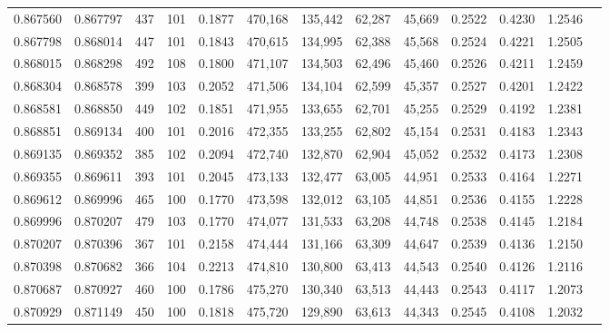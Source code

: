 \begin{tabular}{rrrrrrrrrrrrr}
0.867560 & 0.867797 &   437 & 101 &                                     0.1877 & 470,168 & 135,442 &  62,287 &  45,669 & 0.2522 & 0.4230 & 1.2546 \\
0.867798 & 0.868014 &   447 & 101 &                                     0.1843 & 470,615 & 134,995 &  62,388 &  45,568 & 0.2524 & 0.4221 & 1.2505 \\
0.868015 & 0.868298 &   492 & 108 &                                     0.1800 & 471,107 & 134,503 &  62,496 &  45,460 & 0.2526 & 0.4211 & 1.2459 \\
0.868304 & 0.868578 &   399 & 103 &                                     0.2052 & 471,506 & 134,104 &  62,599 &  45,357 & 0.2527 & 0.4201 & 1.2422 \\
0.868581 & 0.868850 &   449 & 102 &                                     0.1851 & 471,955 & 133,655 &  62,701 &  45,255 & 0.2529 & 0.4192 & 1.2381 \\
0.868851 & 0.869134 &   400 & 101 &                                     0.2016 & 472,355 & 133,255 &  62,802 &  45,154 & 0.2531 & 0.4183 & 1.2343 \\
0.869135 & 0.869352 &   385 & 102 &                                     0.2094 & 472,740 & 132,870 &  62,904 &  45,052 & 0.2532 & 0.4173 & 1.2308 \\
0.869355 & 0.869611 &   393 & 101 &                                     0.2045 & 473,133 & 132,477 &  63,005 &  44,951 & 0.2533 & 0.4164 & 1.2271 \\
0.869612 & 0.869996 &   465 & 100 &                                     0.1770 & 473,598 & 132,012 &  63,105 &  44,851 & 0.2536 & 0.4155 & 1.2228 \\
0.869996 & 0.870207 &   479 & 103 &                                     0.1770 & 474,077 & 131,533 &  63,208 &  44,748 & 0.2538 & 0.4145 & 1.2184 \\
0.870207 & 0.870396 &   367 & 101 &                                     0.2158 & 474,444 & 131,166 &  63,309 &  44,647 & 0.2539 & 0.4136 & 1.2150 \\
0.870398 & 0.870682 &   366 & 104 &                                     0.2213 & 474,810 & 130,800 &  63,413 &  44,543 & 0.2540 & 0.4126 & 1.2116 \\
0.870687 & 0.870927 &   460 & 100 &                                     0.1786 & 475,270 & 130,340 &  63,513 &  44,443 & 0.2543 & 0.4117 & 1.2073 \\
0.870929 & 0.871149 &   450 & 100 &                                     0.1818 & 475,720 & 129,890 &  63,613 &  44,343 & 0.2545 & 0.4108 & 1.2032 \\

\end{tabular}
